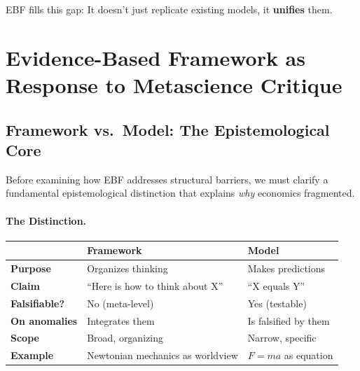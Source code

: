 EBF fills this gap: It doesn't just replicate existing models, it \textbf{unifies} them.



\section{Evidence-Based Framework as Response to Metascience Critique}
\label{sec:meta-ebf}

\subsection{Framework vs.\ Model: The Epistemological Core}
\label{sec:meta-framework-model}

Before examining how EBF addresses structural barriers, we must clarify a fundamental
epistemological distinction that explains \emph{why} economics fragmented.

\paragraph{The Distinction.}
\begin{center}
\renewcommand{\arraystretch}{1.4}
\begin{tabular}{@{}p{3cm}p{5.5cm}p{5.5cm}@{}}
\toprule
& \textbf{Framework} & \textbf{Model} \\
\midrule
\textbf{Purpose} & Organizes thinking & Makes predictions \\
\textbf{Claim} & ``Here is how to think about X'' & ``X equals Y'' \\
\textbf{Falsifiable?} & No (meta-level) & Yes (testable) \\
\textbf{On anomalies} & Integrates them & Is falsified by them \\
\textbf{Scope} & Broad, organizing & Narrow, specific \\
\textbf{Example} & Newtonian mechanics as worldview & $F = ma$ as equation \\
\bottomrule
\end{tabular}
\end{center}


